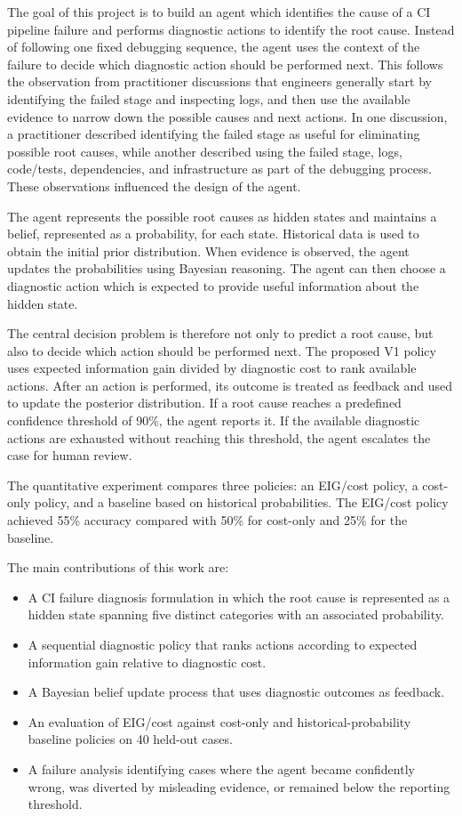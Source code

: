 \documentclass{article}
\begin{document}
The goal of this project is to build an agent which identifies the cause of a CI pipeline failure and performs diagnostic actions to identify the root cause. Instead of following one fixed debugging sequence, the agent uses the context of the failure to decide which diagnostic action should be performed next. This follows the observation from practitioner discussions that engineers generally start by identifying the failed stage and inspecting logs, and then use the available evidence to narrow down the possible causes and next actions. In one discussion, a practitioner described identifying the failed stage as useful for eliminating possible root causes, while another described using the failed stage, logs, code/tests, dependencies, and infrastructure as part of the debugging process. These observations influenced the design of the agent.

The agent represents the possible root causes as hidden states and maintains a belief, represented as a probability, for each state. Historical data is used to obtain the initial prior distribution. When evidence is observed, the agent updates the probabilities using Bayesian reasoning. The agent can then choose a diagnostic action which is expected to provide useful information about the hidden state.

The central decision problem is therefore not only to predict a root cause, but also to decide which action should be performed next. The proposed V1 policy uses expected information gain divided by diagnostic cost to rank available actions. After an action is performed, its outcome is treated as feedback and used to update the posterior distribution. If a root cause reaches a predefined confidence threshold of 90\%, the agent reports it. If the available diagnostic actions are exhausted without reaching this threshold, the agent escalates the case for human review.

The quantitative experiment compares three policies: an EIG/cost policy, a cost-only policy, and a baseline based on historical probabilities. The EIG/cost policy achieved 55\% accuracy compared with 50\% for cost-only and 25\% for the baseline.

The main contributions of this work are:
\begin{itemize}
    \item A CI failure diagnosis formulation in which the root cause is represented as a hidden state spanning five distinct categories with an associated probability.
    \item A sequential diagnostic policy that ranks actions according to expected information gain relative to diagnostic cost.
    \item A Bayesian belief update process that uses diagnostic outcomes as feedback.
    \item An evaluation of EIG/cost against cost-only and historical-probability baseline policies on 40 held-out cases.
    \item A failure analysis identifying cases where the agent became confidently wrong, was diverted by misleading evidence, or remained below the reporting threshold.
\end{itemize}
\end{document}
